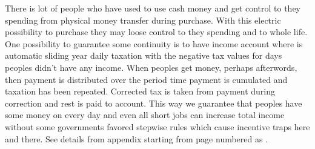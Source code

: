 There is lot of people who have used to use cash money and get control to they spending from physical money transfer during purchase. With this electric possibility to purchase they may loose control to they spending and to whole life. One possibility to guarantee some continuity is to have income account where is automatic sliding year daily taxation with the negative tax values for days peoples didn't have any income. When peoples get money, perhaps afterwords, then payment is distributed over the period time payment is cumulated and taxation has been repeated. Corrected tax is taken from payment during correction and rest is paid to account. This way we guarantee that peoples have some money on every day and even all short jobs can increase total income without some governments favored stepwise rules which cause incentive traps here and there. See details from appendix starting from page numbered as \pageref{dailytax}.

